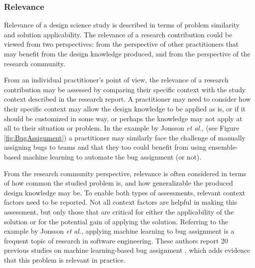 \documentclass[graybox]{svmult}
\begin{document}

\subsubsection{Relevance %
} 

Relevance of a design science study is described in terms of problem similarity and solution applicability. The relevance of a research contribution could be viewed from two perspectives: from the perspective of other practitioners that may benefit from the design knowledge produced, and from the perspective of the research community. 

From an individual practitioner's point of view, the relevance of a research contribution may be assessed by comparing their specific context with the study context described in the research report. 
A practitioner may need to consider how their specific context may allow the design knowledge to be applied as is, or if it should be customized in some way, or perhaps the knowledge may not apply at all to their situation or problem.
In the example by Jonsson \emph{et al.}, (see Figure \ref{fig:BugAssignment}) a practitioner may  similarly face the challenge of manually assigning bugs to teams and  that they too could benefit from using ensemble-based machine learning to automate the bug assignment (or not).

From the research community perspective, relevance is often considered in terms of how common the studied problem is, and how generalizable the produced design knowledge may be. To enable both types of assessments, relevant context factors need to be reported. Not all context factors are helpful in making this assessment, but only those that are critical for either the applicability of the solution or for the potential gain of applying the solution. 
Referring to the example by Jonsson \emph{et al.}, applying machine learning to bug assignment is  a frequent topic of research in software engineering. These authors report 20 previous studies on machine learning-based bug assignment \cite[Fig.2]{JonssonBug15}, which adds evidence that this problem is relevant in practice.
\end{document}
